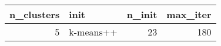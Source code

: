 \begin{tabular}{rlrr}
\toprule
n_clusters & init & n_init & max_iter \\
\midrule
5 & k-means++ & 23 & 180 \\
\bottomrule
\end{tabular}
